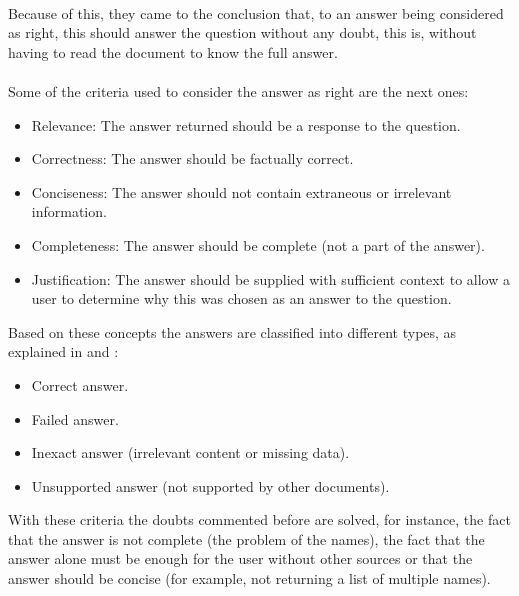 \paragraph{}
Because of this, they came to the conclusion that, to an answer being considered as right, this should answer the question without any doubt, this is, without having to read the document to know the full answer.
\paragraph{}
Some of the criteria used to consider the answer as right are the next ones:\cite{Allam2012}
\begin{itemize}
\item Relevance: The answer returned should be a response to the question.
\item Correctness: The answer should be factually correct.
\item Conciseness: The answer should not contain extraneous or irrelevant information.
\item Completeness: The answer should be complete (not a part of the answer).
\item Justification: The answer should be supplied with sufficient context to allow a user to determine why this was chosen as an answer to the question.
\end{itemize}
Based on these concepts the answers are classified into different types, as explained in \cite{Allam2012} and \cite{Pablo-Sanchez}:
\begin{itemize}
\item Correct answer.
\item Failed answer.
\item Inexact answer (irrelevant content or missing data).
\item Unsupported answer (not supported by other documents).
\end{itemize}
With these criteria the doubts commented before are solved, for instance, the fact that the answer is not complete (the problem of the names), the fact that the answer alone must be enough for the user without other sources or that the answer should be concise (for example, not returning a list of multiple names).
